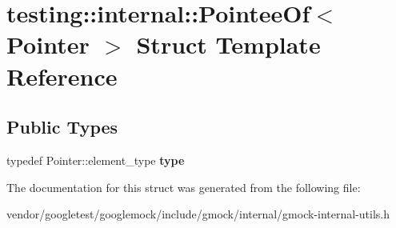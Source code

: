 \hypertarget{structtesting_1_1internal_1_1_pointee_of}{}\section{testing\+:\+:internal\+:\+:Pointee\+Of$<$ Pointer $>$ Struct Template Reference}
\label{structtesting_1_1internal_1_1_pointee_of}
\subsection*{Public Types}
\begin{DoxyCompactItemize}
\item 
\mbox{\label{structtesting_1_1internal_1_1_pointee_of_aca4d92c8f978e47a8695e82cffc11837}} 
typedef Pointer\+::element\+\_\+type {\bfseries type}
\end{DoxyCompactItemize}


The documentation for this struct was generated from the following file\+:\begin{DoxyCompactItemize}
\item 
vendor/googletest/googlemock/include/gmock/internal/gmock-\/internal-\/utils.\+h\end{DoxyCompactItemize}
